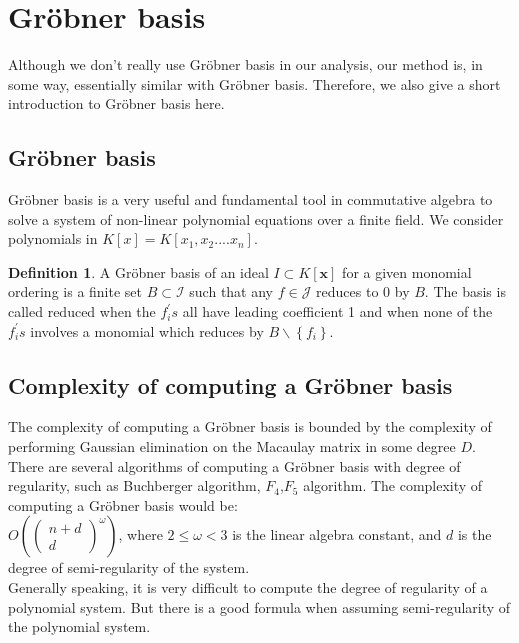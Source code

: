 \documentclass[a4paper]{article}
\theoremstyle{definition}
\newtheorem{definition}{Definition}[section]
\theoremstyle{remark}
\begin{document}
\section{Gr\"{o}bner basis} 
Although we don't really use Gr\"{o}bner basis in our analysis, our method is, in some way, essentially similar with Gr\"{o}bner basis. Therefore, we also give a short introduction to Gr\"{o}bner basis here.
\subsection{Gr\"{o}bner basis}
Gr\"{o}bner basis is a very useful and fundamental tool in commutative algebra to solve a system of non-linear polynomial equations over a finite field. We consider polynomials in $K[x]=K[x_{1},x_{2}....x_{n}]$.
\theoremstyle{definition}
\begin{definition}{}
A Gr\"{o}bner basis of an ideal $I \subset K [ \mathbf { x } ]$ for a given 
monomial ordering is a finite set $B \subset \mathcal { I }$ such that any $f \in \mathcal { J }$ reduces to 0 by $B$. The basis is called reduced when the $f _ { i } ^ { \prime } s$ all have leading coefficient 1 and when none of the $f _ { i } ^ { \prime } s$ involves a monomial which reduces by $B \backslash \left\{ f _ { i } \right\}$. 
\end{definition}

\subsection{Complexity of computing a Gr\"{o}bner basis}
The complexity of computing a Gr\"{o}bner basis is bounded by the complexity of
performing Gaussian elimination on the Macaulay matrix in some degree $D$.
There are several algorithms of computing a Gr\"{o}bner basis with degree of regularity, such as Buchberger algorithm, $F_{4}$,$F_{5}$ algorithm\cite{faugere1999new,buchberger1982computer}.
The complexity of computing a Gr\"{o}bner basis would be:\\
$O \left( \left( \begin{array} { c } { n + d } \\ { d } \end{array} \right) ^ { \omega } \right)$,
where $2\le \omega < 3$ is the linear algebra constant, and $d$ is the degree of semi-regularity of the system.\\
Generally speaking, it is very difficult to compute the degree of regularity of a polynomial system. But there is  a good formula when assuming semi-regularity of the polynomial system.
\end{document}
